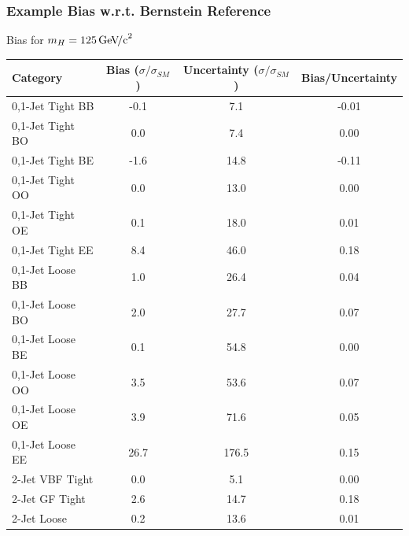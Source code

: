 \documentclass{beamer}
\newcommand{\GeVcc}{\ensuremath{\,\mathrm{Ge\kern -0.1em V\!/c}^2}}
\begin{document}
\begin{frame}
\frametitle{Example Bias w.r.t. Bernstein Reference}
  \vspace{-1ex}
  \begin{center}
    Bias for $m_H=125\GeVcc{}$
    \\ \vspace{0.5ex}
    \scriptsize
    \begin{tabular}{|l|c|c|c|} \hline
Category                  & Bias ($\sigma/\sigma_{SM}$) & Uncertainty  ($\sigma/\sigma_{SM}$) & Bias/Uncertainty \\ \hline \hline
0,1-Jet Tight BB         &       -0.1 &        7.1 &      -0.01 \\ \hline
0,1-Jet Tight BO         &        0.0 &        7.4 &       0.00 \\ \hline
0,1-Jet Tight BE         &       -1.6 &       14.8 &      -0.11 \\ \hline
0,1-Jet Tight OO         &        0.0 &       13.0 &       0.00 \\ \hline
0,1-Jet Tight OE         &        0.1 &       18.0 &       0.01 \\ \hline
0,1-Jet Tight EE         &        8.4 &       46.0 &       0.18 \\ \hline
0,1-Jet Loose BB         &        1.0 &       26.4 &       0.04 \\ \hline
0,1-Jet Loose BO         &        2.0 &       27.7 &       0.07 \\ \hline
0,1-Jet Loose BE         &        0.1 &       54.8 &       0.00 \\ \hline
0,1-Jet Loose OO         &        3.5 &       53.6 &       0.07 \\ \hline
0,1-Jet Loose OE         &        3.9 &       71.6 &       0.05 \\ \hline
0,1-Jet Loose EE         &       26.7 &      176.5 &       0.15 \\ \hline
2-Jet VBF Tight          &        0.0 &        5.1 &       0.00 \\ \hline
2-Jet GF Tight           &        2.6 &       14.7 &       0.18 \\ \hline
2-Jet Loose              &        0.2 &       13.6 &       0.01 \\ \hline
    \end{tabular}
\\
  \small
  \end{center}
\end{frame}
\end{document}

